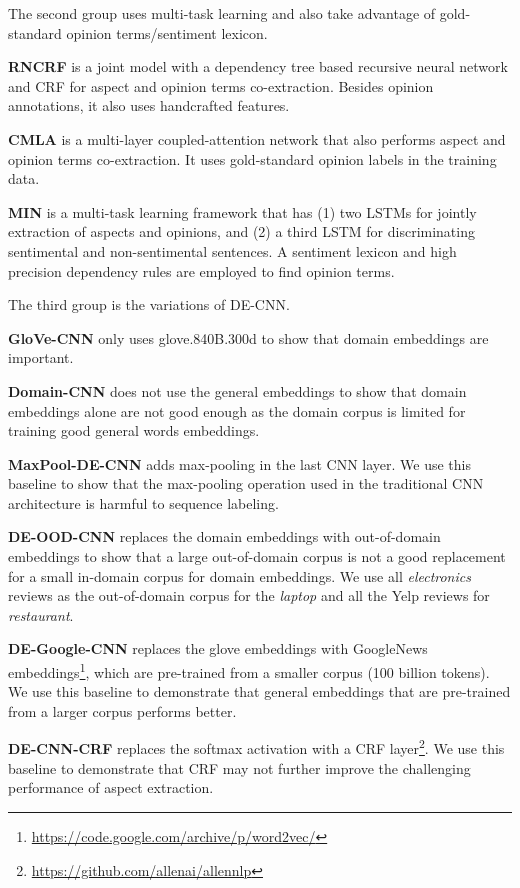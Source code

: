 \documentclass[11pt,a4paper]{article}
\begin{document}
The second group uses multi-task learning and also take advantage of gold-standard opinion terms/sentiment lexicon.

\textbf{RNCRF} \cite{wang2016recursive} is a joint model with a dependency tree based recursive neural network and CRF for aspect and opinion terms co-extraction. 
Besides opinion annotations, it also uses handcrafted features.

\textbf{CMLA} \cite{wang2017coupled} is a multi-layer coupled-attention network that also performs aspect and opinion terms co-extraction. It uses gold-standard opinion labels in the training data.

\textbf{MIN} \cite{li2017deep} is a multi-task learning framework that has (1) two LSTMs for jointly extraction of aspects and opinions, and (2) a third LSTM for discriminating sentimental and non-sentimental sentences. 
A sentiment lexicon and high precision dependency rules are employed to find opinion terms. 

The third group is the variations of DE-CNN.

\textbf{GloVe-CNN} only uses glove.840B.300d to show that domain embeddings are important. 

\textbf{Domain-CNN} does not use the general embeddings to show that domain embeddings alone are not good enough as the domain corpus is limited for training good general words embeddings.

\textbf{MaxPool-DE-CNN} adds max-pooling in the last CNN layer. We use this baseline to show that the max-pooling operation used in the traditional CNN architecture is harmful to sequence labeling.

\textbf{DE-OOD-CNN} replaces the domain embeddings with out-of-domain embeddings to show that a large out-of-domain corpus is not a good replacement for a small in-domain corpus for domain embeddings.
We use all \textit{electronics} reviews as the out-of-domain corpus for the \textit{laptop} and all the Yelp reviews for \textit{restaurant}.

\textbf{DE-Google-CNN} replaces the glove embeddings with GoogleNews embeddings\footnote{\url{https://code.google.com/archive/p/word2vec/} }, which are pre-trained from a smaller corpus (100 billion tokens). We use this baseline to demonstrate that general embeddings that are pre-trained from a larger corpus performs better.

\textbf{DE-CNN-CRF} replaces the softmax activation with a CRF layer\footnote{\url{https://github.com/allenai/allennlp}}. We use this baseline to demonstrate that CRF may not further improve the challenging performance of aspect extraction.
\end{document}
